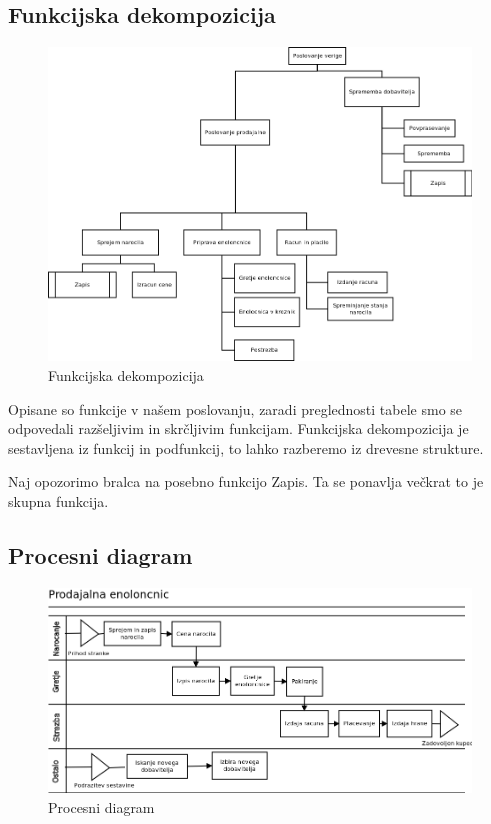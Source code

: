 \documentclass[12pt]{article}
\begin{document}
\newpage

\subsection{Funkcijska dekompozicija}

\begin{figure}[htb]
\begin{center}
\includegraphics[scale=0.5]{funkcijska_dekompozicija.png}
\end{center}
\caption{Funkcijska dekompozicija}
\label{funkcijska_dekompozicija}
\end{figure}

Opisane so funkcije v našem poslovanju, zaradi preglednosti tabele smo se odpovedali razšeljivim in skrčljivim funkcijam.
Funkcijska dekompozicija je sestavljena iz funkcij in podfunkcij, to lahko razberemo iz drevesne strukture.

Naj opozorimo bralca na posebno funkcijo Zapis. Ta se ponavlja večkrat to je skupna funkcija.


\newpage

\subsection{Procesni diagram}

\begin{figure}[htb]
\begin{center}
\includegraphics[scale=0.5]{procesni.png}
\end{center}
\caption{Procesni diagram}
\label{procesni}
\end{figure}
\end{document}
